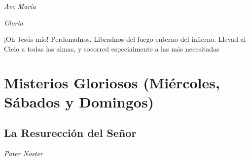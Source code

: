 \documentclass[a4paper,11pt, oneside]{report}
\begin{document}
        \textit{Ave María} \par
        \indent\textit{Gloria} \par
        \indent¡Oh Jesús mío! Perdonadnos. Libradnos del fuego enterno del infierno. Llevad al Cielo a todas las almas, y socorred especialmente a las más 
        necesitadas
        
    \section*{Misterios Gloriosos (Miércoles, Sábados y Domingos)}
      \subsection*{La Resurección del Señor}
      
        \textit{Pater Noster}
\end{document}
